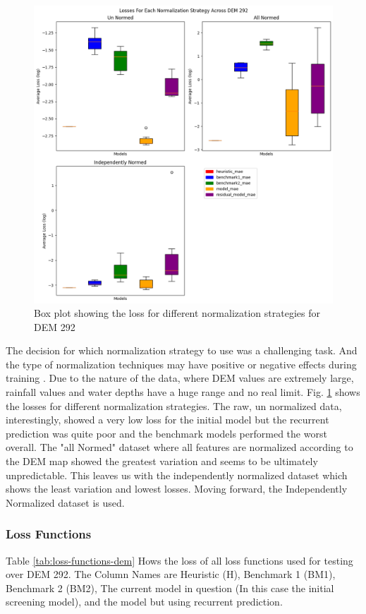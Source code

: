 \begin{figure}[tbph]
	\centering
	\includegraphics[width=0.9\linewidth, height=0.5\textheight]{"Figures/Results/Initial screening/Normalization plots/Box_Loss_Norm_strat"}
	\caption[Box plot for different normalization strategies]{Box plot showing the loss for different normalization strategies for DEM 292}
	\label{fig:norm-strat-292}
\end{figure}
The decision for which normalization strategy to use was a challenging task. And the type of normalization techniques may have positive or negative effects during training \cite{singh2015investigations}. Due to the nature of the data, where DEM values are extremely large, rainfall values and water depths have a huge range and no real limit. Fig. \ref{fig:norm-strat-292} shows the losses for different normalization strategies. The raw, un normalized data, interestingly, showed a very low loss for the initial model but the recurrent prediction was quite poor and the benchmark models performed the worst overall. The "all Normed" dataset where all features are normalized according to the DEM map showed the greatest variation and seems to be ultimately unpredictable. This leaves us with the independently normalized dataset which shows the least variation and lowest losses. Moving forward, the Independently Normalized dataset is used.
\subsubsection*{Loss Functions}
Table \ref{tab:loss-functions-dem} Hows the loss of all loss functions used for testing over DEM 292. The Column Names are Heuristic (H), Benchmark 1 (BM1), Benchmark 2 (BM2), The current model in question (In this case the initial screening model), and the model but using recurrent prediction.

